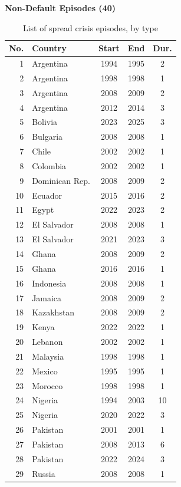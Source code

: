 \documentclass[12pt]{article}
\renewcommand{\arraystretch}{1.25}
\begin{document}
\begin{table}[th]
\centering
\caption{List of spread crisis episodes, by type}
\label{tab:A2}
\footnotesize
\renewcommand{\arraystretch}{1.0}
\begin{minipage}[t]{0.48\textwidth}
\centering
\textbf{Non-Default Episodes (40)}\\[2pt]
\begin{tabular}{rlccc}
\toprule
No. & Country & Start & End & Dur. \\
\midrule
1 & Argentina & 1994 & 1995 & 2 \\
2 & Argentina & 1998 & 1998 & 1 \\
3 & Argentina & 2008 & 2009 & 2 \\
4 & Argentina & 2012 & 2014 & 3 \\
5 & Bolivia & 2023 & 2025 & 3 \\
6 & Bulgaria & 2008 & 2008 & 1 \\
7 & Chile & 2002 & 2002 & 1 \\
8 & Colombia & 2002 & 2002 & 1 \\
9 & Dominican Rep. & 2008 & 2009 & 2 \\
10 & Ecuador & 2015 & 2016 & 2 \\
11 & Egypt & 2022 & 2023 & 2 \\
12 & El Salvador & 2008 & 2008 & 1 \\
13 & El Salvador & 2021 & 2023 & 3 \\
14 & Ghana & 2008 & 2009 & 2 \\
15 & Ghana & 2016 & 2016 & 1 \\
16 & Indonesia & 2008 & 2008 & 1 \\
17 & Jamaica & 2008 & 2009 & 2 \\
18 & Kazakhstan & 2008 & 2009 & 2 \\
19 & Kenya & 2022 & 2022 & 1 \\
20 & Lebanon & 2002 & 2002 & 1 \\
21 & Malaysia & 1998 & 1998 & 1 \\
22 & Mexico & 1995 & 1995 & 1 \\
23 & Morocco & 1998 & 1998 & 1 \\
24 & Nigeria & 1994 & 2003 & 10 \\
25 & Nigeria & 2020 & 2022 & 3 \\
26 & Pakistan & 2001 & 2001 & 1 \\
27 & Pakistan & 2008 & 2013 & 6 \\
28 & Pakistan & 2022 & 2024 & 3 \\
29 & Russia & 2008 & 2008 & 1 \\

\end{tabular}
\end{minipage}
\end{table}
\end{document}

